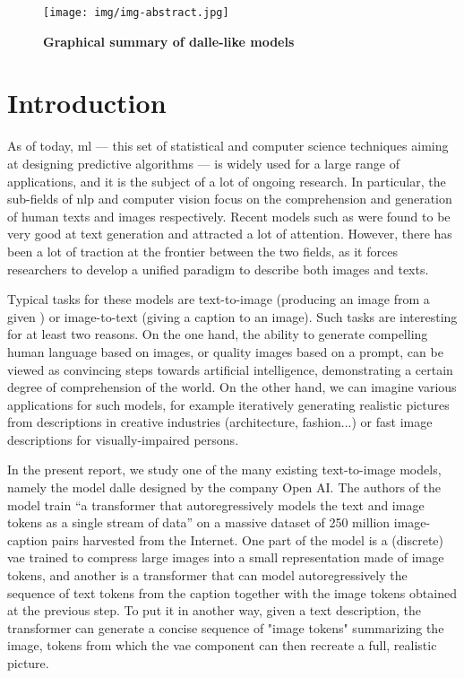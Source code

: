 \documentclass{article}
\begin{document}

\begin{figure}[b!]
    \centering
    \texttt{[image: img/img-abstract.jpg]}
    \caption{\textbf{Graphical summary of \gls{dalle}-like models}}
    \label{fig:img-abstract}
\end{figure}

\pagebreak
\section{Introduction}

\begin{multicols}{2}

As of today, \gls{ml} — this set of statistical and computer science techniques aiming at designing predictive algorithms — is widely used for a large range of applications, and it is the subject of a lot of ongoing research. In particular, the sub-fields of \gls{nlp} and computer vision focus on the comprehension and generation of human texts and images respectively. Recent models such as  were found to be very good at text generation and attracted a lot of attention. However, there has been a lot of traction at the frontier between the two fields, as it forces researchers to develop a unified paradigm to describe both images and texts.

Typical tasks for these models are text-to-image (producing an image from a given ) or image-to-text (giving a caption to an image). Such tasks are interesting for at least two reasons. On the one hand, the ability to generate compelling human language based on images, or quality images based on a prompt, can be viewed as convincing steps towards artificial intelligence, demonstrating a certain degree of comprehension of the world. On the other hand, we can imagine various applications for such models, for example iteratively generating realistic pictures from descriptions in creative industries (architecture, fashion...) or fast image descriptions for visually-impaired persons. 

In the present report, we study one of the many existing text-to-image models, namely the model \gls{dalle} designed by the company Open AI. The authors of the model train \enquote{a transformer that autoregressively models the text and image tokens as a single stream of data} on a massive dataset of 250 million image-caption pairs harvested from the Internet. One part of the model is a (discrete) \gls{vae} trained to compress large images into a small representation made of image \glspl{token}, and another is a \gls{transformer} that can model autoregressively the sequence of text tokens from the caption together with the image tokens obtained at the previous step. To put it in another way, given a text description, the transformer can generate a concise sequence of "image tokens" summarizing the image, tokens from which the \gls{vae} component can then recreate a full, realistic picture.


\end{multicols}
\end{document}
